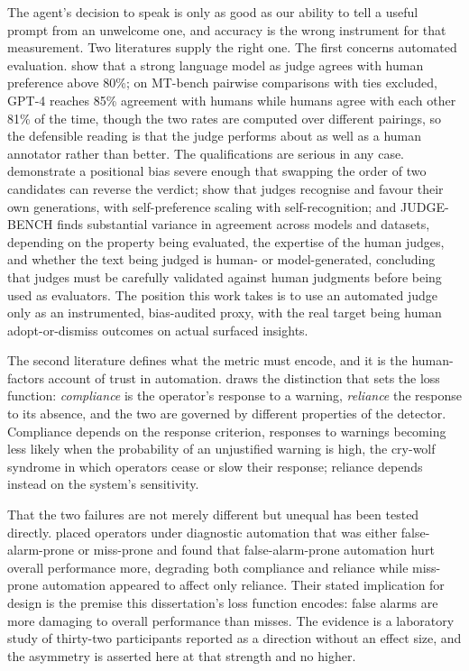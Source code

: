 The agent's decision to speak is only as good as our ability to tell a useful
prompt from an unwelcome one, and accuracy is the wrong instrument for that
measurement. Two literatures supply the right one. The first concerns automated
evaluation. \citet{zheng_judging_2023} show that a strong language model as judge
agrees with human preference above 80\%; on MT-bench pairwise comparisons with
ties excluded, GPT-4 reaches 85\% agreement with humans while humans agree with
each other 81\% of the time, though the two rates are computed over different
pairings, so the defensible reading is that the judge performs about as well as a
human annotator rather than better. The qualifications are serious in any case.
\citet{wang_large_2024} demonstrate a positional bias severe enough that swapping
the order of two candidates can reverse the verdict;
\citet{panickssery_llm_2024} show that judges recognise and favour their own
generations, with self-preference scaling with self-recognition; and JUDGE-BENCH
\citep{bavaresco_llms_2025} finds substantial variance in agreement across models
and datasets, depending on the property being evaluated, the expertise of the
human judges, and whether the text being judged is human- or model-generated,
concluding that judges must be carefully validated against human judgments before
being used as evaluators. The position this work takes is to use an automated
judge only as an instrumented, bias-audited proxy, with the real target being
human adopt-or-dismiss outcomes on actual surfaced insights.

The second literature defines what the metric must encode, and it is the
human-factors account of trust in automation. \citet{meyer_conceptual_2004} draws
the distinction that sets the loss function: \emph{compliance} is the operator's
response to a warning, \emph{reliance} the response to its absence, and the two
are governed by different properties of the detector. Compliance depends on the
response criterion, responses to warnings becoming less likely when the
probability of an unjustified warning is high, the cry-wolf syndrome in which
operators cease or slow their response; reliance depends instead on the system's
sensitivity.

That the two failures are not merely different but unequal has been tested
directly. \citet{dixon_independence_2007} placed operators under diagnostic
automation that was either false-alarm-prone or miss-prone and found that
false-alarm-prone automation hurt overall performance more, degrading both
compliance and reliance while miss-prone automation appeared to affect only
reliance. Their stated implication for design is the premise this dissertation's
loss function encodes: false alarms are more damaging to overall performance than
misses. The evidence is a laboratory study of thirty-two participants reported as
a direction without an effect size, and the asymmetry is asserted here at that
strength and no higher.


